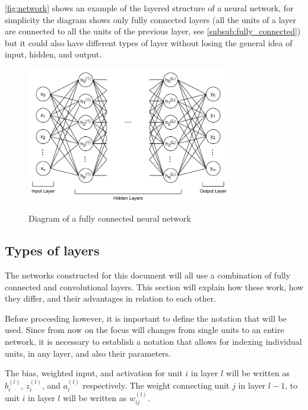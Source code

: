 \autoref{fig:network} shows an example of the layered structure of a neural network, for simplicity the diagram shows only fully connected layers (all the units of a layer are connected to all the units of the previous layer, see \autoref{subsub:fully_connected}) but it could also have different types of layer without losing the general idea of input, hidden, and output.
\begin{figure}[hbt]
    \centering
    \caption{Diagram of a fully connected neural network}
    \includegraphics[width=0.8\textwidth]{chapters/NeuralNets/figures/network.pdf}
    \label{fig:network}
\end{figure}


\subsection{Types of layers}
The networks constructed for this document will all use a combination of fully connected and convolutional layers. This section will explain how these work, how they differ, and their advantages in relation to each other.

Before proceeding however, it is important to define the notation that will be used. Since from now on the focus will changes from single units to an entire network, it is necessary to establish a notation that allows for indexing individual units, in any layer, and also their parameters.

The bias, weighted input, and activation for unit $i$ in layer $l$ will be written as $b_{i}^{(l)}$, $z_{i}^{(l)}$, and $a_{i}^{(l)}$ respectively. The weight connecting unit $j$ in layer $l-1$, to unit $i$ in layer $l$ will be written as $w_{ij}^{(l)}$.

